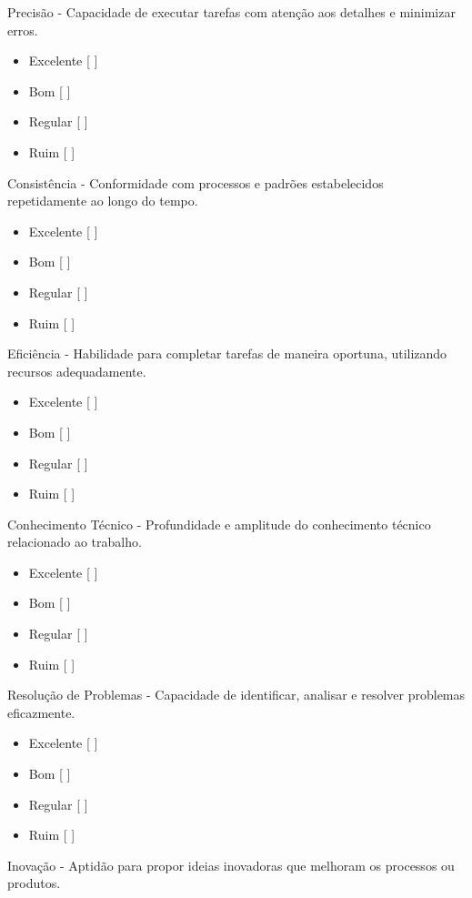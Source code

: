 \documentclass[8pt]{article}
\begin{document}
\begin{multicols}{2}

Precisão - Capacidade de executar tarefas com atenção aos detalhes e minimizar erros.
    \begin{itemize}
        \item Excelente [ ]
        \item Bom       [ ]
        \item Regular   [ ]
        \item Ruim      [ ]
    \end{itemize}
Consistência - Conformidade com processos e padrões estabelecidos repetidamente ao longo do tempo.
    \begin{itemize}
        \item Excelente [ ]
        \item Bom       [ ]
        \item Regular   [ ]
        \item Ruim      [ ]
    \end{itemize}
Eficiência - Habilidade para completar tarefas de maneira oportuna, utilizando recursos adequadamente.
    \begin{itemize}
        \item Excelente [ ]
        \item Bom       [ ]
        \item Regular   [ ]
        \item Ruim      [ ]
    \end{itemize}
Conhecimento Técnico - Profundidade e amplitude do conhecimento técnico relacionado ao trabalho.
    \begin{itemize}
        \item Excelente [ ]
        \item Bom       [ ]
        \item Regular   [ ]
        \item Ruim      [ ]
    \end{itemize}
Resolução de Problemas - Capacidade de identificar, analisar e resolver problemas eficazmente.
    \begin{itemize}
        \item Excelente [ ]
        \item Bom       [ ]
        \item Regular   [ ]
        \item Ruim      [ ]
    \end{itemize}
Inovação - Aptidão para propor ideias inovadoras que melhoram os processos ou produtos.

\end{multicols}
\end{document}
